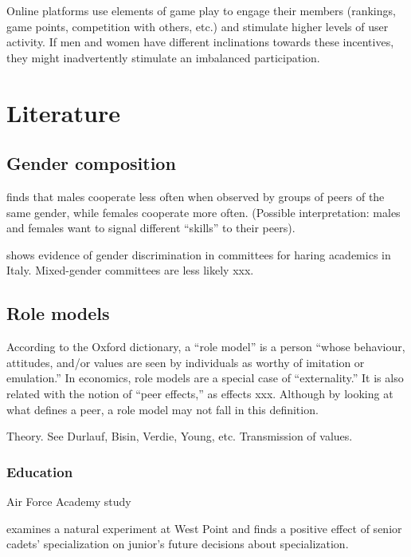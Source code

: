 \documentclass[12pt, titlepage]{article}
\begin{document}
Online platforms use elements of game play to engage their members
(rankings, game points, competition with others, etc.) and stimulate
higher levels of user activity. If men and women have different
inclinations towards these incentives, they might inadvertently
stimulate an imbalanced participation.

\section{Literature}\label{literature}

\subsection{Gender composition}\label{gender-composition}

\citet{charness2011gender} finds that males cooperate less often when
observed by groups of peers of the same gender, while females cooperate
more often. (Possible interpretation: males and females want to signal
different ``skills'' to their peers).

\citet{de2015gender} shows evidence of gender discrimination in
committees for haring academics in Italy. Mixed-gender committees are
less likely xxx.

\subsection{Role models}\label{role-models}

According to the Oxford dictionary, a ``role model'' is a person ``whose
behaviour, attitudes, and/or values are seen by individuals as worthy of
imitation or emulation.'' In economics, role models are a special case
of ``externality.'' It is also related with the notion of ``peer
effects,'' as effects xxx. Although by looking at what defines a peer, a
role model may not fall in this definition.

Theory. See Durlauf, Bisin, Verdie, Young, etc. Transmission of values.

\subsubsection{Education}\label{education}

\citet{carrell2010sex} Air Force Academy study

\citet{lyle2007estimating} examines a natural experiment at West Point
and finds a positive effect of senior cadets' specialization on junior's
future decisions about specialization.
\end{document}
